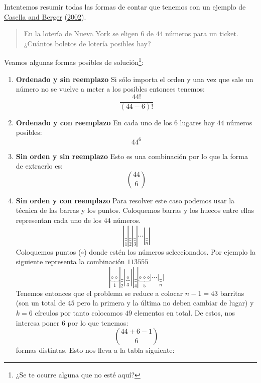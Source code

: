 \documentclass[
]{book}
\begin{document}
Intentemos resumir todas las formas de contar que tenemos con un ejemplo de \protect\hyperlink{ref-casella2002statistical}{Casella and Berger} (\protect\hyperlink{ref-casella2002statistical}{2002}).

\begin{quote}
En la lotería de Nueva York se eligen \(6\) de \(44\) números para un ticket. ¿Cuántos boletos de lotería posibles hay?
\end{quote}

Veamos algunas formas posibles de solución\footnote{¿Se te ocurre alguna que no esté aquí?}:

\begin{enumerate}
\def\labelenumi{\alph{enumi}.}
\item
  \textbf{Ordenado y sin reemplazo} Si sólo importa el orden y una vez que sale un número no se vuelve a meter a los posibles entonces tenemos:
  \[
  \frac{44!}{(44-6)!}
  \]
\item
  \textbf{Ordenado y con reemplazo} En cada uno de los \(6\) lugares hay \(44\) números posibles:
  \[
  44^6
  \]
\item
  \textbf{Sin orden y sin reemplazo} Esto es una combinación por lo que la forma de extraerlo es:
  \[
  \binom{44}{6}
  \]
\item
  \textbf{Sin orden y con reemplazo} Para resolver este caso podemos usar la técnica de las barras y los puntos. Coloquemos barras y los huecos entre ellas representan cada uno de los \(44\) números.
  \begin{equation}\nonumber
  |\underbrace{\_}_{1}|\underbrace{\_}_{2}|\underbrace{\_}_{3}|\cdots |\underbrace{\_}_{n}|
  \end{equation}
  Coloquemos puntos (\(\circ\)) donde estén los números seleccionados. Por ejemplo la siguiente representa la combinación \(113555\)
  \begin{equation}\nonumber
  |\underbrace{\circ \circ}_{1}|\underbrace{\_}_{2}|\underbrace{\circ}_{3}||\underbrace{\_}_{4}|\underbrace{\circ \circ \circ}_{5}|\cdots |\underbrace{\_}_{n}|
  \end{equation}
  Tenemos entonces que el problema se reduce a colocar \(n - 1= 43\) barritas (son un total de \(45\) pero la primera y la última no deben cambiar de lugar) y \(k = 6\) círculos por tanto colocamos \(49\) elementos en total. De estos, nos interesa poner \(6\) por lo que tenemos:
  \[
  \binom{44 + 6  - 1}{6}
  \]
  formas distintas. Esto nos lleva a la tabla siguiente:
\end{enumerate}
\end{document}
